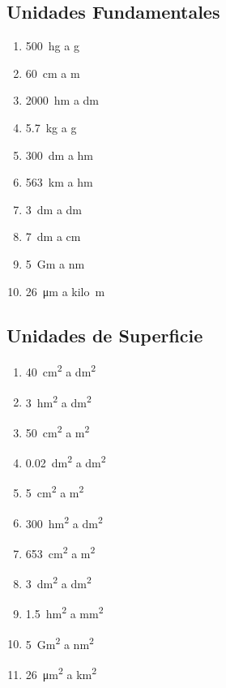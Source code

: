 \subsection{Unidades Fundamentales}

\begin{exercise}
    \phantom{a}
    \begin{enumerate}[label=\letraminuscula]
        \item \qty{500}{\hecto\g} a \unit{\g}
        \item \qty{60}{\centi\metre} a \unit{\metre}
        \item \qty{2000}{\hecto\metre} a \unit{\deca\metre}
        \item \qty{5.7}{\kilo\g} a \unit{\g}
        \item \qty{300}{\deci\metre} a \unit{\hecto\metre}
        \item \qty{563}{\kilo\metre} a \unit{\hecto\metre}
        \item \qty{3}{\deci\metre} a \unit{\deca\metre}
        \item \qty{7}{\deci\metre} a \unit{\centi\metre}
        \item  \qty{5}{\giga\m} a \unit{\nano\m}
        \item \qty{26}{\micro\m} a \unit{kilo\m}
    \end{enumerate}
\end{exercise}

\subsection{Unidades de Superficie}
\begin{exercise}
    \phantom{a}
    \begin{enumerate}[label=\letraminuscula]
        \item \qty{40}{\square\centi\m} a \unit{\square\deci\m}
        \item \qty{3}{\square\hecto\m} a \unit{\square\deci\m}
        \item \qty{50}{\square\centi\m} a \unit{\square\m}
        \item \qty{0.02}{\square\deci\m} a \unit{\square\deca\m}
        \item \qty{5}{\square\centi\m} a \unit{\square\m}
        \item \qty{300}{\square\hecto\m} a \unit{\square\deci\m}
        \item \qty{653}{\square\centi\m} a \unit{\square\m}
        \item \qty{3}{\square\deci\m} a \unit{\square\deca\m}
        \item \qty{1.5}{\square\hecto\m} a \unit{\square\milli\m}
        \item  \qty{5}{\square\giga\m} a \unit{\square\nano\m}
        \item \qty{26}{\square\micro\m} a \unit{\square\kilo\m}
    \end{enumerate}
\end{exercise}

